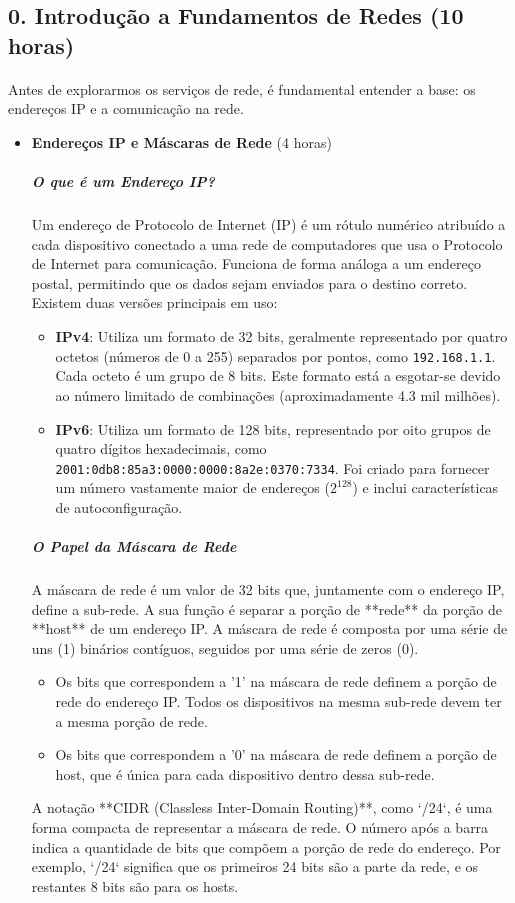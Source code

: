 \documentclass[10pt,a4paper]{article}
\begin{document}
	\subsection*{0. Introdução a Fundamentos de Redes (10 horas)}
	\vspace{-1em}
	\paragraph{}
	Antes de explorarmos os serviços de rede, é fundamental entender a base: os endereços IP e a comunicação na rede.
	
	\begin{itemize}
		\item \textbf{Endereços IP e Máscaras de Rede} (4 horas)
		\subparagraph{O que é um Endereço IP?} Um endereço de Protocolo de Internet (IP) é um rótulo numérico atribuído a cada dispositivo conectado a uma rede de computadores que usa o Protocolo de Internet para comunicação. Funciona de forma análoga a um endereço postal, permitindo que os dados sejam enviados para o destino correto. Existem duas versões principais em uso:
		\begin{itemize}
			\item \textbf{IPv4}: Utiliza um formato de 32 bits, geralmente representado por quatro octetos (números de 0 a 255) separados por pontos, como \texttt{192.168.1.1}. Cada octeto é um grupo de 8 bits. Este formato está a esgotar-se devido ao número limitado de combinações (aproximadamente 4.3 mil milhões).
			\item \textbf{IPv6}: Utiliza um formato de 128 bits, representado por oito grupos de quatro dígitos hexadecimais, como \texttt{2001:0db8:85a3:0000:0000:8a2e:0370:7334}. Foi criado para fornecer um número vastamente maior de endereços ($2^{128}$) e inclui características de autoconfiguração.
		\end{itemize}
		\subparagraph{O Papel da Máscara de Rede} A máscara de rede é um valor de 32 bits que, juntamente com o endereço IP, define a sub-rede. A sua função é separar a porção de **rede** da porção de **host** de um endereço IP. A máscara de rede é composta por uma série de uns (1) binários contíguos, seguidos por uma série de zeros (0).
		\begin{itemize}
			\item Os bits que correspondem a '1' na máscara de rede definem a porção de rede do endereço IP. Todos os dispositivos na mesma sub-rede devem ter a mesma porção de rede.
			\item Os bits que correspondem a '0' na máscara de rede definem a porção de host, que é única para cada dispositivo dentro dessa sub-rede.
		\end{itemize}
		A notação **CIDR (Classless Inter-Domain Routing)**, como `/24`, é uma forma compacta de representar a máscara de rede. O número após a barra indica a quantidade de bits que compõem a porção de rede do endereço. Por exemplo, `/24` significa que os primeiros 24 bits são a parte da rede, e os restantes 8 bits são para os hosts.
		

\end{itemize}
\end{document}
